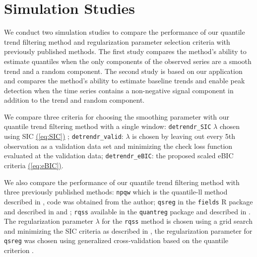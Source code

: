 \documentclass[12pt]{article}
\newcommand{\Eqn}[1]{\hyperref[eq:#1]{{\rm (\ref*{eq:#1})}}} %
\newcommand{\Eqn}[1]{{(\ref{eq:#1})}} %
\begin{document}
\section{Simulation Studies}
\label{sec:simluation}

	We conduct two simulation studies to compare the performance of our quantile trend filtering method and regularization parameter selection criteria with previously published methods. The first study compares the method's ability to estimate quantiles when the only components of the observed series are a smooth trend and a random component. The second study is based on our application and compares the method's ability to estimate baseline trends and enable peak detection when the time series contains a non-negative signal component in addition to the trend and random component.

	We compare three criteria for choosing the smoothing parameter with our quantile trend filtering method with a single window: \texttt{detrendr\_SIC} $\lambda$ chosen using SIC \Eqn{SIC} \citep{KoenkerNgPortnoy1994}; \texttt{detrendr\_valid}: $\lambda$ is chosen by leaving out every 5th observation as a validation data set and minimizing the check loss function evaluated at the validation data; \texttt{detrendr\_eBIC}:  the proposed scaled eBIC criteria \Eqn{eBIC}.

	We also compare the performance of our quantile trend filtering method with three previously published methods: \texttt{npqw} which is the quantile-ll method described in \cite{Racine2017}, code was obtained from the author; \texttt{qsreg} in the \texttt{fields} R package and described in \cite{Oh2011} and \cite{nychka1995nonparametric}; \texttt{rqss} available in the \texttt{quantreg} package and described in \cite{KoenkerNgPortnoy1994}.  The regularization parameter $\lambda$ for the \texttt{rqss} method is chosen using a grid search and minimizing the SIC criteria as described in \cite{KoenkerNgPortnoy1994}, the regularization parameter for \texttt{qsreg} was chosen using generalized cross-validation based on the quantile criterion \cite{Oh2011}.

\end{document}
